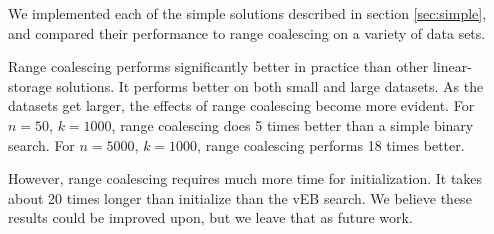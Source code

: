 We implemented each of the simple solutions described in section \ref{sec:simple}, and compared their performance to range coalescing on a variety of data sets. 

Range coalescing performs significantly better in practice than other linear-storage solutions. It performs better on both small and large datasets. As the datasets get larger, the effects of range coalescing become more evident. For $n=50$, $k=1000$, range coalescing does 5 times better than a simple binary search. For $n=5000$, $k=1000$, range coalescing performs 18 times better.

However, range coalescing requires much more time for initialization. It takes about 20 times longer than initialize than the vEB search. We believe these results could be improved upon, but we leave that as future work.


